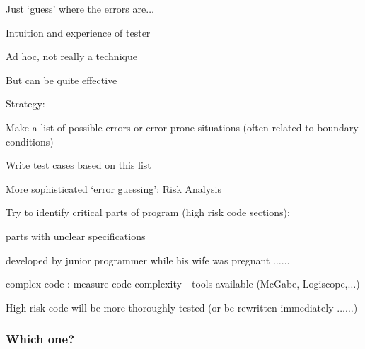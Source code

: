 \begin{itemize*}
	\item Just `guess’ where the errors are$\ldots$
	\item Intuition and experience of tester
	\item Ad hoc, not really a technique
	\item But can be quite effective
	\item Strategy:
	\begin{itemize*}
		\item Make a list of possible errors or error-prone situations (often related to boundary conditions)
		\item Write test cases based on this list
	\end{itemize*}
	\item More sophisticated `error guessing': Risk Analysis
	\item Try to identify critical parts of program
	(high risk code sections):
	\begin{itemize*}
		\item parts with unclear specifications
		\item developed by junior programmer while his wife was pregnant $\ldots\ldots$
		\item complex code :
		measure code complexity - tools available (McGabe, Logiscope,$\ldots$)
	\end{itemize*}
	\item High-risk code will be more thoroughly tested (or be rewritten immediately $\ldots\ldots$)
	
\end{itemize*}

\subsubsection{Which one?}

